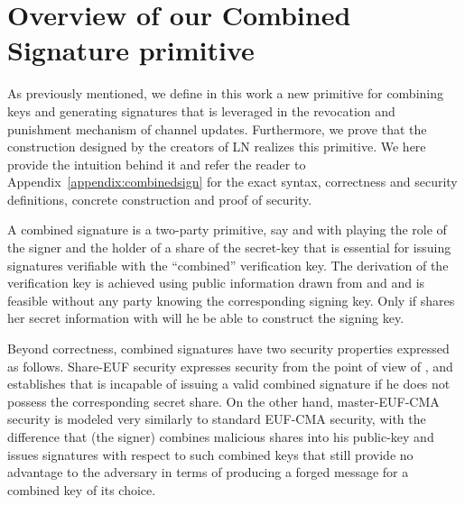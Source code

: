 \section{Overview of our Combined Signature primitive}
  As previously mentioned, we define in this work a new primitive for combining
  keys and generating signatures that is leveraged in the revocation and
  punishment mechanism of channel updates. Furthermore, we prove that the
  construction designed by the creators of LN realizes this primitive. We here
  provide the intuition behind it and refer the reader to
  Appendix~\ref{appendix:combinedsign} for the exact syntax, correctness and
  security definitions, concrete construction and proof of security.

  A combined signature is a two-party primitive, say \alice{} and \bob{} with
  \bob{} playing the role of the signer and \alice{} the holder of a share of
  the secret-key that is essential for issuing signatures verifiable with the
  ``combined'' verification key. The  derivation of the verification key is
  achieved  using public information drawn from  \alice{} and \bob and is
  feasible without any party knowing the corresponding signing key. Only if
  \alice{} shares her secret information with \bob{} will he be able to
  construct the signing key.

  Beyond correctness, combined signatures have two security properties expressed
  as follows. Share-EUF security expresses security from the point of view of
  \alice{}, and establishes that \bob{} is incapable of issuing a valid combined
  signature if he does not possess the corresponding secret share. On the other
  hand, master-EUF-CMA security is modeled very similarly to standard EUF-CMA
  security, with the difference that \bob{} (the signer) combines malicious
  shares into his public-key and issues signatures with respect to such combined
  keys that still provide no advantage to the adversary in terms of producing a
  forged message for a combined key of its choice.

